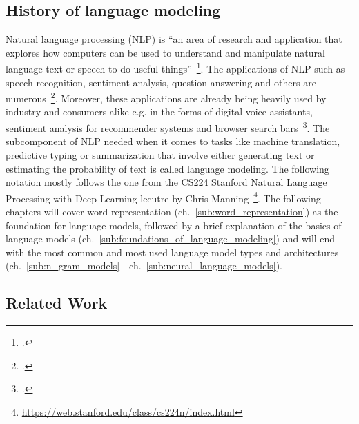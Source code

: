 



\subsection{History of language modeling}
\label{sec:history_of_language_modeling}

Natural language processing (NLP) is “an area of research and application that explores how computers can be used to understand and manipulate natural language text or speech to do useful things”~\footcite{doi:10.1002/aris.1440370103}. The applications of NLP such as speech recognition, sentiment analysis, question answering and others are numerous~\footcite{DBLP:journals/corr/GattK17}. Moreover, these applications are already being heavily used by industry and consumers alike e.g. in the forms of digital voice assistants, sentiment analysis for recommender systems and browser search bars~\footcite{8012330,10.1145/3064663.3064672,GoogleSearch}. The subcomponent of NLP needed when it comes to tasks like machine translation, predictive typing or summarization that involve either generating text or estimating the probability of text is called language modeling. The following notation mostly follows the one from the CS224 Stanford Natural Language Processing with Deep Learning lecutre by Chris Manning~\footnote{\url{https://web.stanford.edu/class/cs224n/index.html}}. The following chapters will cover word representation (ch.~\ref{sub:word_representation}) as the foundation for language models, followed by a brief explanation of the basics of language models (ch.~\ref{sub:foundations_of_language_modeling}) and will end with the most common and most used language model types and architectures (ch.~\ref{sub:n_gram_models} - ch.~\ref{sub:neural_language_models}).













\subsection{Related Work}
\label{sec:related_work}

